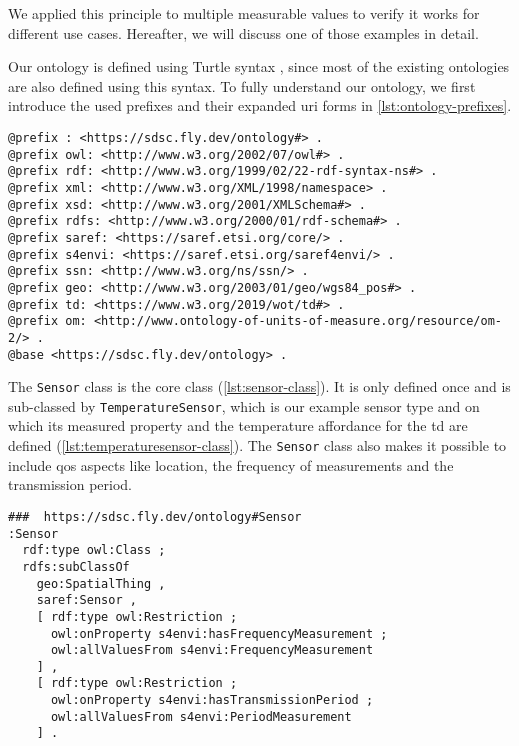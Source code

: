 We applied this principle to multiple measurable values to verify it works for different use cases. Hereafter, we will discuss one of those examples in detail.

Our ontology is defined using Turtle syntax \autocite{w3c.turtle}, since most of the existing ontologies are also defined using this syntax. To fully understand our ontology, we first introduce the used prefixes and their expanded \gls{uri} forms in \autoref{lst:ontology-prefixes}.

\begin{lstlisting}[language=turtle,caption={Ontology prefixes},label={lst:ontology-prefixes}]
@prefix : <https://sdsc.fly.dev/ontology#> .
@prefix owl: <http://www.w3.org/2002/07/owl#> .
@prefix rdf: <http://www.w3.org/1999/02/22-rdf-syntax-ns#> .
@prefix xml: <http://www.w3.org/XML/1998/namespace> .
@prefix xsd: <http://www.w3.org/2001/XMLSchema#> .
@prefix rdfs: <http://www.w3.org/2000/01/rdf-schema#> .
@prefix saref: <https://saref.etsi.org/core/> .
@prefix s4envi: <https://saref.etsi.org/saref4envi/> .
@prefix ssn: <http://www.w3.org/ns/ssn/> .
@prefix geo: <http://www.w3.org/2003/01/geo/wgs84_pos#> .
@prefix td: <https://www.w3.org/2019/wot/td#> .
@prefix om: <http://www.ontology-of-units-of-measure.org/resource/om-2/> .
@base <https://sdsc.fly.dev/ontology> .
\end{lstlisting}

The \lstinline|Sensor| class is the core class (\autoref{lst:sensor-class}). It is only defined once and is sub-classed by \lstinline|TemperatureSensor|, which is our example sensor type and on which its measured property and the temperature affordance for the \gls{td} are defined (\autoref{lst:temperaturesensor-class}). The \lstinline|Sensor| class also makes it possible to include \gls{qos} aspects like location, the frequency of measurements and the transmission period.

\begin{lstlisting}[language=turtle,caption={{\ttfamily{}Sensor} class},label={lst:sensor-class}]
###  https://sdsc.fly.dev/ontology#Sensor
:Sensor
  rdf:type owl:Class ;
  rdfs:subClassOf
    geo:SpatialThing ,
    saref:Sensor ,
    [ rdf:type owl:Restriction ;
      owl:onProperty s4envi:hasFrequencyMeasurement ;
      owl:allValuesFrom s4envi:FrequencyMeasurement
    ] ,
    [ rdf:type owl:Restriction ;
      owl:onProperty s4envi:hasTransmissionPeriod ;
      owl:allValuesFrom s4envi:PeriodMeasurement
    ] .
\end{lstlisting}


